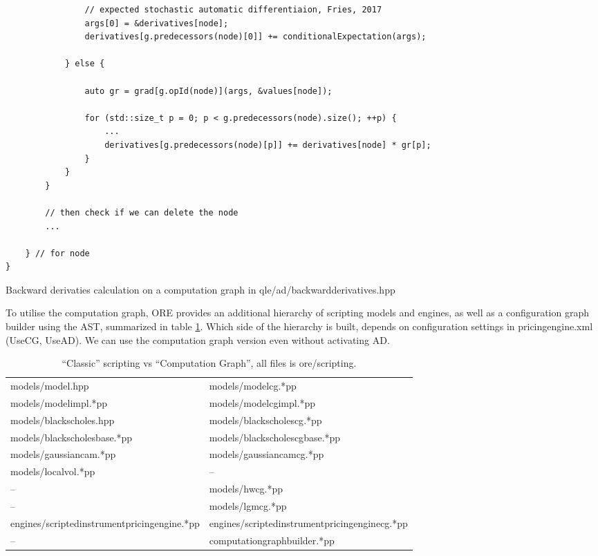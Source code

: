 \documentclass[12pt, a4paper]{report}
\begin{document}
\begin{listing}
\begin{verbatim}
                // expected stochastic automatic differentiaion, Fries, 2017
                args[0] = &derivatives[node];
                derivatives[g.predecessors(node)[0]] += conditionalExpectation(args);

            } else {

                auto gr = grad[g.opId(node)](args, &values[node]);

                for (std::size_t p = 0; p < g.predecessors(node).size(); ++p) {
                    ...
                    derivatives[g.predecessors(node)[p]] += derivatives[node] * gr[p];
                }
            }
        }

        // then check if we can delete the node
        ...

    } // for node
}
\end{verbatim}
\caption{Backward derivaties calculation on a computation graph in qle/ad/backwardderivatives.hpp}
\label{lst:backwardderivatives}
\end{listing}

To utilise the computation graph, ORE provides an additional hierarchy of scripting models and
engines, as well as a configuration graph builder using the AST, summarized in table \ref{tab:cg}.
Which side of the hierarchy is built, depends on configuration settings in pricingengine.xml
(UseCG, UseAD). We can use the computation graph version even without activating AD.

\begin{table}[htb]
  \scriptsize
  \begin{tabular}{|l|l|}
    \hline
    models/model.hpp &
    models/model{\color{red}cg}.*pp \\
    models/modelimpl.*pp &
    models/model{\color{red}cg}impl.*pp \\
    models/blackscholes.hpp &
    models/blackscholes{\color{red}cg}.*pp \\
    models/blackscholesbase.*pp &
    models/blackscholes{\color{red}cg}base.*pp \\
    models/gaussiancam.*pp &
    models/gaussiancam{\color{red}cg}.*pp \\
    models/localvol.*pp & -- \\
    -- & models/hw{\color{red}cg}.*pp \\
    -- & models/lgm{\color{red}cg}.*pp \\
    \hline
    engines/scriptedinstrumentpricingengine.*pp &
    engines/scriptedinstrumentpricingengine{\color{red}cg}.*pp \\
    \hline
    -- & computationgraphbuilder.*pp \\
    \hline
\end{tabular}
\caption{``Classic'' scripting vs ``Computation Graph'', all files is ore/scripting.}
\label{tab:cg}
\end{table}
\end{document}
